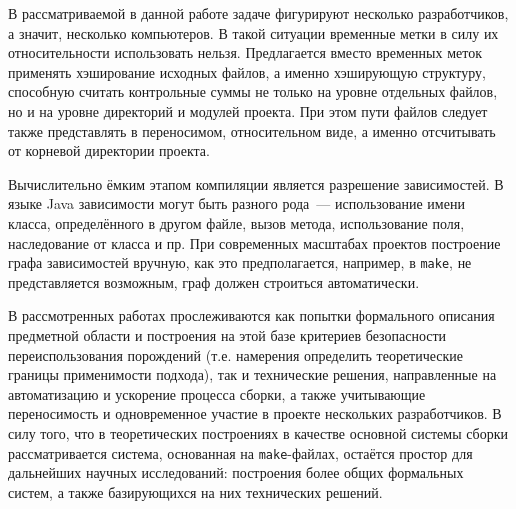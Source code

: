 В рассматриваемой в данной работе задаче фигурируют несколько разработчиков, а значит, несколько компьютеров. В такой ситуации временные метки в силу их относительности использовать нельзя. Предлагается вместо временных меток применять хэширование исходных файлов, а именно хэширующую структуру, способную считать контрольные суммы не только на уровне отдельных файлов, но и на уровне директорий и модулей проекта. При этом пути файлов следует также представлять в переносимом, относительном виде, а именно отсчитывать от корневой директории проекта.

Вычислительно ёмким этапом компиляции является разрешение зависимостей. В языке Java зависимости могут быть разного рода~--- использование имени класса, определённого в другом файле, вызов метода, использование поля, наследование от класса и пр. При современных масштабах проектов построение графа зависимостей вручную, как это предполагается, например, в \texttt{make}, не представляется возможным, граф должен строиться автоматически.

В рассмотренных работах прослеживаются как попытки формального описания предметной области и построения на этой базе критериев безопасности переиспользования порождений (т.е. намерения определить теоретические границы применимости подхода), так и технические решения, направленные на автоматизацию и ускорение процесса сборки, а также учитывающие переносимость и одновременное участие в проекте нескольких разработчиков. В силу того, что в теоретических построениях в качестве основной системы сборки рассматривается система, основанная на \texttt{make}-файлах, остаётся простор для дальнейших научных исследований: построения более общих формальных систем, а также базирующихся на них технических решений.
